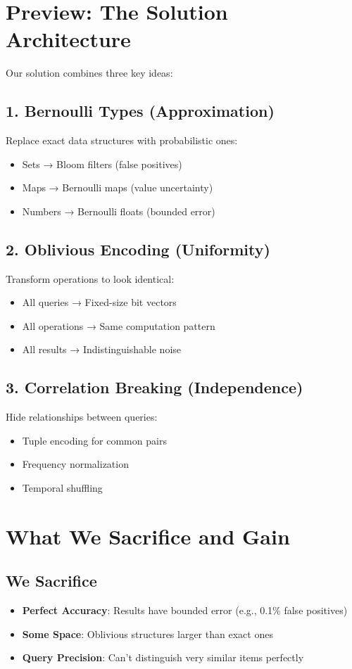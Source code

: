 \section{Preview: The Solution Architecture}

Our solution combines three key ideas:

\subsection{1. Bernoulli Types (Approximation)}
Replace exact data structures with probabilistic ones:
\begin{itemize}
\item Sets → Bloom filters (false positives)
\item Maps → Bernoulli maps (value uncertainty)
\item Numbers → Bernoulli floats (bounded error)
\end{itemize}

\subsection{2. Oblivious Encoding (Uniformity)}
Transform operations to look identical:
\begin{itemize}
\item All queries → Fixed-size bit vectors
\item All operations → Same computation pattern
\item All results → Indistinguishable noise
\end{itemize}

\subsection{3. Correlation Breaking (Independence)}
Hide relationships between queries:
\begin{itemize}
\item Tuple encoding for common pairs
\item Frequency normalization
\item Temporal shuffling
\end{itemize}

\section{What We Sacrifice and Gain}

\subsection{We Sacrifice}
\begin{itemize}
\item \textbf{Perfect Accuracy}: Results have bounded error (e.g., 0.1\% false positives)
\item \textbf{Some Space}: Oblivious structures larger than exact ones
\item \textbf{Query Precision}: Can't distinguish very similar items perfectly
\end{itemize}

